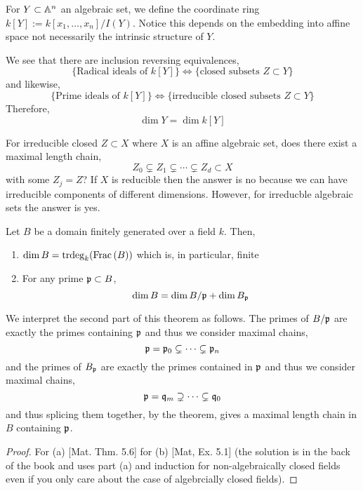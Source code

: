 \documentclass[12pt]{article}
\begin{document}
\begin{defn}
For $Y \subset \mathbb{A}^n$ an algebraic set, we define the coordinate ring $k[Y] := k[x_1, \dots, x_n]/I(Y)$. Notice this depends on the embedding into affine space not necessarily the intrinsic structure of $Y$.
\end{defn}

\begin{rmk}
We see that there are inclusion reversing equivalences,
\[ \{ \text{Radical ideals of } k[Y] \} \iff \{ \text{closed subsets } Z \subset Y \} \]
and likewise,
\[ \{ \text{Prime ideals of } k[Y] \} \iff \{ \text{irreducible closed subsets } Z \subset Y \} \]
Therefore,
\[ \dim{Y} = \dim{k[Y]} \]
\end{rmk}

\begin{rmk}
For irreducible closed $Z \subset X$ where $X$ is an affine algebraic set, does there exist a maximal length chain,
\[ Z_0 \subsetneq Z_1 \subsetneq \cdots \subsetneq Z_d \subset X \]
with some $Z_j = Z$? If $X$ is reducible then the answer is no because we can have irreducible components of different dimensions. However, for irreducble algebraic sets the answer is yes. 
\end{rmk}

\begin{thm}
Let $B$ be a domain finitely generated over a field $k$. Then,
\begin{enumerate}
\item $\dim{B} = \mathrm{trdeg}_{k}(\mathrm{Frac}\left(B\right))$ which is, in particular, finite
\item For any prime $\mathfrak{p} \subset B$,
\[ \dim{B} = \dim{B/\mathfrak{p}} + \dim{B_{\mathfrak{p}}} \]
\end{enumerate}
\end{thm}

\begin{rmk}
We interpret the second part of this theorem as follows. The primes of $B / \mathfrak{p}$ are exactly the primes containing $\mathfrak{p}$ and thus we consider maximal chains,
\[ \mathfrak{p} = \mathfrak{p}_0 \subsetneq \cdots \subsetneq \mathfrak{p}_n \]
and the primes of $B_{\mathfrak{p}}$ are exactly the primes contained in $\mathfrak{p}$ and thus we consider maximal chains,
\[ \mathfrak{p} = \mathfrak{q}_m \supsetneq \cdots \subsetneq \mathfrak{q}_0 \]
and thus splicing them together, by the theorem, gives a maximal length chain in $B$ containing $\mathfrak{p}$.
\end{rmk}

\begin{proof}
For (a) [Mat. Thm. 5.6] for (b) [Mat, Ex. 5.1] (the solution is in the back of the book and uses part (a) and induction for non-algebraically closed fields even if you only care about the case of algebrcially closed fields).  
\end{proof}
\end{document}
